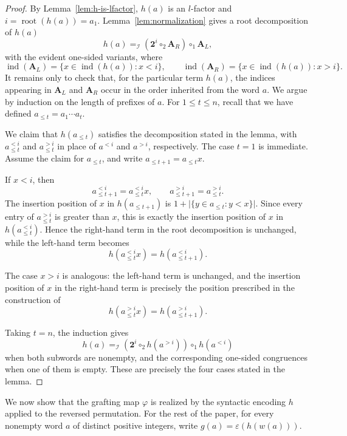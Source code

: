 \documentclass[a4paper]{article}
\theoremstyle{plain}
\theoremstyle{definition}
\theoremstyle{remark}
\numberwithin{equation}{section}
\renewcommand{\leq}{\leqslant}\renewcommand{\geq}{\geqslant}
\newcommand{\eval}{\varepsilon}
\begin{document}
\begin{proof}
By Lemma~\ref{lem:h-is-lfactor}, \(h(a)\) is an \(l\)-factor and $i=\operatorname{root}(h(a))=a_1$. Lemma~\ref{lem:normalization} gives a root decomposition of \(h(a)\)
\[
h(a)=_{\mathcal I}(\mathbf 2^i\circ_2 \mathbf A_R)\circ_1 \mathbf A_L,
\]
with the evident one-sided variants, where
\[
\operatorname{ind}(\mathbf A_L)=\{x\in\operatorname{ind}(h(a)):x<i\},
\qquad
\operatorname{ind}(\mathbf A_R)=\{x\in\operatorname{ind}(h(a)):x>i\}.
\]
It remains only to check that, for the particular term \(h(a)\), the indices
appearing in \(\mathbf A_L\) and \(\mathbf A_R\) occur in the order inherited from the word
\(a\). We argue by induction on the length of prefixes of \(a\). For \(1\leq t\leq n\), recall that we have defined $a_{\leq t}=a_1\cdots a_t$.

We claim that \(h(a_{\leq t})\) satisfies the decomposition stated in the lemma,
with \(a_{\leq t}^{<i}\) and \(a_{\leq t}^{>i}\) in place of \(a^{<i}\) and
\(a^{>i}\), respectively. The case \(t=1\) is immediate. Assume the claim for \(a_{\leq t}\), and write $a_{\leq t+1}=a_{\leq t}x$.

If \(x<i\), then
\[
a_{\leq t+1}^{<i}=a_{\leq t}^{<i}x,
\qquad
a_{\leq t+1}^{>i}=a_{\leq t}^{>i}.
\]
The insertion position of \(x\) in \(h(a_{\leq t+1})\) is $1+\bigl|\{y\in a_{\leq t}:y<x\}\bigr|$. Since every entry of \(a_{\leq t}^{>i}\) is greater than \(x\), this is exactly
the insertion position of \(x\) in \(h(a_{\leq t}^{<i})\). Hence the right-hand
term in the root decomposition is unchanged, while the left-hand term becomes
\[
h(a_{\leq t}^{<i}x)=h(a_{\leq t+1}^{<i}).
\]

The case \(x>i\) is analogous: the left-hand term is unchanged, and the insertion
position of \(x\) in the right-hand term is precisely the position prescribed in
the construction of
\[
h(a_{\leq t}^{>i}x)=h(a_{\leq t+1}^{>i}).
\]

Taking \(t=n\), the induction gives
\[
h(a)=_{\mathcal I}
(\mathbf 2^i\circ_2 h(a^{>i}))\circ_1 h(a^{<i})
\]
when both subwords are nonempty, and the corresponding one-sided
congruences when one of them is empty. These are precisely the four cases stated
in the lemma.
\end{proof}

We now show that the grafting map \(\varphi\) is realized by the syntactic
encoding \(h\) applied to the reversed permutation. For the rest of the paper, for every nonempty word \(a\) of distinct positive integers, write \(g(a)=\eval(h(w(a)))\).
\end{document}
